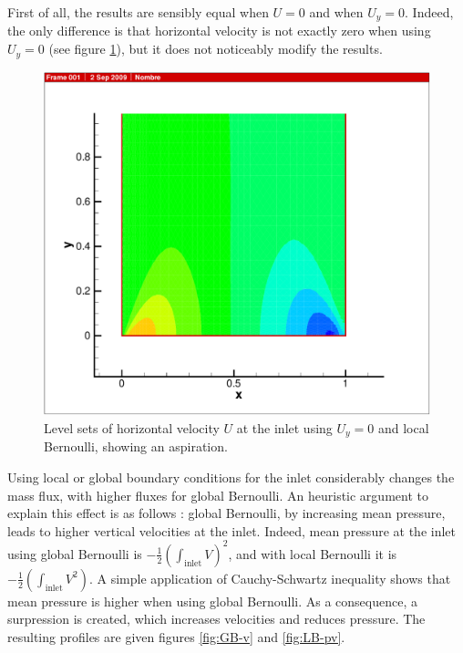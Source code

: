 \documentclass[12pt]{article}
\begin{document}


First of all, the results are sensibly equal when $U = 0$ and when
$U_y = 0$. Indeed, the only difference is that horizontal velocity
is not exactly zero when using $U_y = 0$ (see figure \ref{fig:LB-0-0-u-bas}), but it does not noticeably
modify the results.

\begin{figure}[h!]
\centering
\includegraphics[width=\textwidth]{figs/LB-0-0-u-bas}
\caption{Level sets of horizontal velocity $U$ at the inlet using
  $U_{y} = 0$ and local Bernoulli, showing an aspiration.}
\label{fig:LB-0-0-u-bas}
\end{figure}


Using local or global boundary conditions for the inlet considerably
changes the mass flux, with higher fluxes for global Bernoulli. An
heuristic argument to explain this effect is as follows : global
Bernoulli, by increasing mean pressure, leads to higher vertical
velocities at the inlet. Indeed, mean pressure at the inlet using
global Bernoulli is $- \frac 1 2 (\int_{\text{inlet}} V)^{2}$, and with local
Bernoulli it is $- \frac 1 2 (\int_{\text{inlet}} V^{2})$. A simple
application of Cauchy-Schwartz inequality shows that mean pressure is
higher when using global Bernoulli. As a consequence, a surpression is
created, which increases velocities and reduces pressure. The
resulting profiles are given figures \ref{fig:GB-v} and \ref{fig:LB-pv}.
\end{document}
